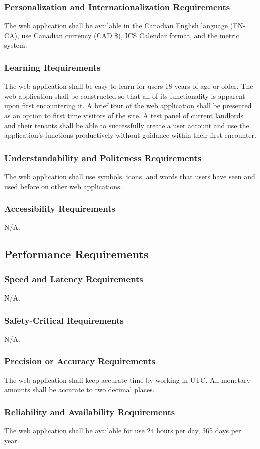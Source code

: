 \documentclass[12pt]{article}
\begin{document}
{\subsubsection{Personalization and Internationalization Requirements}
The web application shall be available in the Canadian English language (EN-CA),  use 
Canadian currency (CAD \$), ICS Calendar format, and the metric system.
\subsubsection{Learning Requirements}
The web application shall be easy to learn for users 18 years of age or older. The web 
application shall be constructed so that all of its functionality is apparent 
upon first encountering it. A brief tour of the web application shall be 
presented as an option to first time visitors of the site. A test panel of 
current landlords and their tenants shall be able to successfully create a user 
account and use the application's functions productively without guidance within 
their first encounter.
\subsubsection{Understandability and Politeness Requirements}
The web application shall use symbols, icons, and words that users have seen and used before on other web applications.
\subsubsection{Accessibility Requirements}
N/A.
\subsection{Performance Requirements}
\subsubsection{Speed and Latency Requirements}
N/A.
\subsubsection{Safety-Critical Requirements}
N/A.
\subsubsection{Precision or Accuracy Requirements}
The web application shall keep accurate time by working in UTC. All monetary 
amounts shall be accurate to two decimal places. 
\subsubsection{Reliability and Availability Requirements}
The web application shall be available for use 24 hours per day, 365 days per 
year.
}
\end{document}
